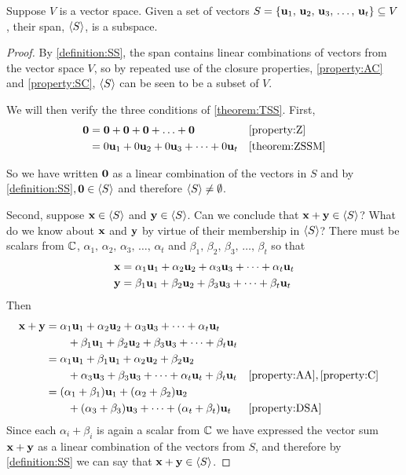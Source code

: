 \documentclass{ximera}
\begin{document}
\begin{theorem}
  \label{theorem:SSS}

  Suppose $V$ is a vector space.  Given a set of vectors $S=\{\mathbf{u}_{1},\,\mathbf{u}_{2},\,\mathbf{u}_{3},\,\ldots,\,\mathbf{u}_{t}\}\subseteq V$, their span, $\left\langle S\right\rangle$, is a subspace.

  \begin{proof}
    By \ref{definition:SS}, the span contains linear combinations of
    vectors from the vector space $V$, so by repeated use of the
    closure properties, \ref{property:AC} and \ref{property:SC},
    $\left\langle S\right\rangle$ can be seen to be a subset of $V$.

    We will then verify the three conditions of \ref{theorem:TSS}.
    First,
    \begin{align*}
      \mathbf{0}
      &=\mathbf{0}+\mathbf{0}+\mathbf{0}+\ldots+\mathbf{0}&&\ref{property:Z}\\
      &=0\mathbf{u}_1+0\mathbf{u}_2+0\mathbf{u}_3+\cdots+0\mathbf{u}_t&&\ref{theorem:ZSSM}
    \end{align*}
    
    So we have written $\mathbf{0}$ as a linear combination of the
    vectors in $S$ and by \ref{definition:SS}$, \mathbf{0}\in\left\langle S\right\rangle$
    and therefore $\left\langle S\right\rangle\neq\emptyset$.

    Second, suppose $\mathbf{x}\in\left\langle S\right\rangle$ and $\mathbf{y}\in\left\langle S\right\rangle$.
    Can we conclude that $\mathbf{x}+\mathbf{y}\in\left\langle S\right\rangle$?  What do we
    know about $\mathbf{x}$ and $\mathbf{y}$ by virtue of their membership
    in $\left\langle S\right\rangle$?  There must be scalars from $\mathbb{C}$,
    $\alpha_1,\,\alpha_2,\,\alpha_3,\,\ldots,\,\alpha_t$ and
    $\beta_1,\,\beta_2,\,\beta_3,\,\ldots,\,\beta_t$ so that
    \begin{align*}
      \mathbf{x}&=\alpha_{1}\mathbf{u}_{1}+\alpha_{2}\mathbf{u}_{2}+\alpha_{3}\mathbf{u}_{3}+\cdots +\alpha_{t}\mathbf{u}_{t}\\
      \mathbf{y}&=\beta_{1}\mathbf{u}_{1}+\beta_{2}\mathbf{u}_{2}+\beta_{3}\mathbf{u}_{3}+\cdots +\beta_{t}\mathbf{u}_{t}
    \end{align*}
    Then
    \begin{align*}
      \mathbf{x}+\mathbf{y}&=\alpha_{1}\mathbf{u}_{1}+\alpha_{2}\mathbf{u}_{2}+\alpha_{3}\mathbf{u}_{3}+\cdots +\alpha_{t}\mathbf{u}_{t}\\
                       &\quad\quad+\beta_{1}\mathbf{u}_{1}+\beta_{2}\mathbf{u}_{2}+\beta_{3}\mathbf{u}_{3}+\cdots +\beta_{t}\mathbf{u}_{t}\\
                       &=\alpha_1\mathbf{u}_1+\beta_1\mathbf{u}_1+\alpha_2\mathbf{u}_2+\beta_2\mathbf{u}_2\\
                       &\quad\quad+\alpha_3\mathbf{u}_3+\beta_3\mathbf{u}_3+\cdots+\alpha_t\mathbf{u}_t+\beta_t\mathbf{u}_t&&\ref{property:AA}, \ref{property:C}\\
                       &=(\alpha_1+\beta_1)\mathbf{u}_1+(\alpha_2+\beta_2)\mathbf{u}_2\\
                       &\quad\quad+(\alpha_3+\beta_3)\mathbf{u}_3+\cdots+(\alpha_t+\beta_t)\mathbf{u}_t&&\ref{property:DSA}
    \end{align*}
    Since each $\alpha_i+\beta_i$ is again a scalar from $\mathbb{C}$
    we have expressed the vector sum $\mathbf{x}+\mathbf{y}$ as a linear
    combination of the vectors from $S$, and therefore by
    \ref{definition:SS} we can say that $\mathbf{x}+\mathbf{y}\in\left\langle S\right\rangle$.


\end{proof}
\end{theorem}
\end{document}
